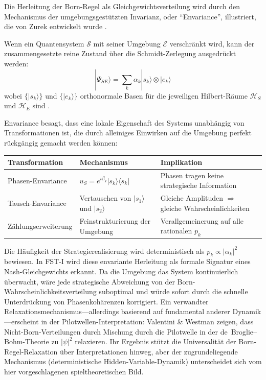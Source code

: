 \documentclass[12pt,a4paper]{article}
\theoremstyle{remark}
\begin{document}
Die Herleitung der Born-Regel als Gleichgewichtsverteilung wird durch den Mechanismus der umgebungsgest\"utzten Invarianz, oder ``Envariance'', illustriert, die von Zurek entwickelt wurde \citep{Zurek2003,Zurek2005}.

Wenn ein Quantensystem $\mathcal{S}$ mit seiner Umgebung $\mathcal{E}$ verschr\"ankt wird, kann der zusammengesetzte reine Zustand \"uber die Schmidt-Zerlegung ausgedr\"uckt werden:
\begin{equation}
|\Psi_{SE}\rangle = \sum_k \alpha_k |s_k\rangle \otimes |e_k\rangle
\end{equation}
wobei $\{|s_k\rangle\}$ und $\{|e_k\rangle\}$ orthonormale Basen f\"ur die jeweiligen Hilbert-R\"aume $\mathcal{H}_S$ und $\mathcal{H}_E$ sind \citep{ZurekDerivation2003}.

Envariance besagt, dass eine lokale Eigenschaft des Systems unabh\"angig von Transformationen ist, die durch alleiniges Einwirken auf die Umgebung perfekt r\"uckg\"angig gemacht werden k\"onnen:

\begin{center}
\begin{tabular}{lll}
\toprule
\textbf{Transformation} & \textbf{Mechanismus} & \textbf{Implikation} \\
\midrule
Phasen-Envariance & $u_S = e^{i\beta_k}|s_k\rangle\langle s_k|$ & Phasen tragen keine strategische Information \\
Tausch-Envariance & Vertauschen von $|s_1\rangle$ und $|s_2\rangle$ & Gleiche Amplituden $\Rightarrow$ gleiche Wahrscheinlichkeiten \\
Z\"ahlungserweiterung & Feinstrukturierung der Umgebung & Verallgemeinerung auf alle rationalen $p_k$ \\
\bottomrule
\end{tabular}
\end{center}

Die H\"aufigkeit der Strategierealisierung wird deterministisch als $p_k \propto |\alpha_k|^2$ bewiesen. In FST-I wird diese envariante Herleitung als formale Signatur eines Nash-Gleichgewichts erkannt. Da die Umgebung das System kontinuierlich \"uberwacht, w\"are jede strategische Abweichung von der Born-Wahrscheinlichkeitsverteilung suboptimal und w\"urde sofort durch die schnelle Unterdr\"uckung von Phasenkoh\"arenzen korrigiert. Ein verwandter Relaxationsmechanismus---allerdings basierend auf fundamental anderer Dynamik---erscheint in der Pilotwellen-Interpretation: Valentini \& Westman \citep{ValentiniWestman2005} zeigen, dass Nicht-Born-Verteilungen durch Mischung durch die Pilotwelle in der de~Broglie--Bohm-Theorie zu $|\psi|^2$ relaxieren. Ihr Ergebnis st\"utzt die Universalit\"at der Born-Regel-Relaxation \"uber Interpretationen hinweg, aber der zugrundeliegende Mechanismus (deterministische Hidden-Variable-Dynamik) unterscheidet sich vom hier vorgeschlagenen spieltheoretischen Bild.
\end{document}
